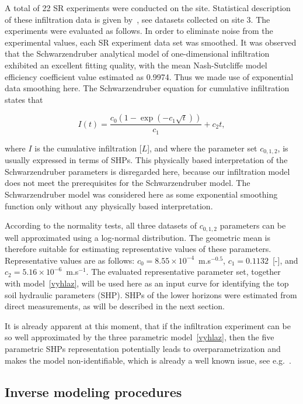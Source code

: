\documentclass[review]{elsarticle}
\newenvironment{lineq}
    {\begin{linenomath*}
    \begin{equation}
    }
    { 
    \end{equation} 
    \end{linenomath*}
    }
\begin{document}
A total of 22 SR experiments were conducted on the site. Statistical description of these infiltration data is given by~\citep{jacka-site}, see datasets collected on site 3. The experiments were evaluated as follows. In order to eliminate noise from the experimental values, each SR experiment data set was smoothed. It was observed that the Schwarzendruber analytical model of one-dimensional infiltration exhibited an excellent fitting quality, with the mean  Nash-Sutcliffe model efficiency coefficient value estimated as 0.9974. Thus we made use of  exponential data smoothing here. The Schwarzendruber equation for cumulative infiltration  states that
\begin{lineq}
I(t)=\frac{c_0\left(1-\exp\left(-c_1\sqrt{t}\right)\right)}{c_1}+c_2t,
\label{vyhlaz}
\end{lineq}
where $I$ is the cumulative infiltration [$L$], and where the parameter set $c_{0,1,2}$, is usually expressed in terms of SHPs. This physically based interpretation of the Schwarzendruber parameters is disregarded here, because our infiltration model does not meet the prerequisites for the Schwarzendruber model. The Schwarzendruber model was  considered here as some exponential smoothing function only without any physically  based interpretation.


According to the normality tests,  all three datasets of $c_{0,1,2}$ parameters can be well approximated  using a log-normal distribution. The geometric mean is therefore suitable for estimating representative values of these parameters. Representative values are as follows: $c_0 = 8.55\times 10^{-4}$~m.s$^{-0.5}$, $c_1 = 0.1132$~[-], and $c_2 = 5.16\times 10^{-6}$~m.s$^{-1}$. The evaluated representative  parameter set, together with  model~\eqref{vyhlaz}, will be used here as an input curve for identifying the top soil hydraulic parameters (SHP). SHPs of the lower horizons were estimated from direct measurements, as will be described in the next section.

It is already apparent at this moment, that if the infiltration experiment can be so well approximated by the three parametric model~\eqref{vyhlaz}, then the five parametric SHPs representation potentially leads to overparametrization and makes the model non-identifiable, which is already a well known issue, see e.g.~\citep{bellman1970}.  






\subsection{Inverse modeling procedures}
\label{invproc}
\end{document}
